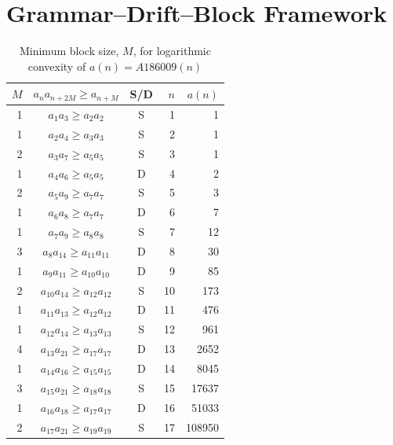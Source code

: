 \documentclass[12pt, oneside]{article}
\numberwithin{equation}{section}
\theoremstyle{definition}
\theoremstyle{plain}
\theoremstyle{remark}
\begin{document}
\section{Grammar–Drift–Block Framework}
\label{sec:grammar-drift-block}

\begin{table}[htbp]
\centering
\caption{Minimum block size, $M$, for logarithmic convexity of $a(n) = A186009(n)$}
\label{tab:A186009}
\vspace{4pt}
\begin{tabular}{@{}rccrr@{}}
\toprule
$M$ & $a_{n} a_{n+2M} \ge a_{n+M}$ & {S/D} & $n$ & $a(n)$ \\
\midrule
1 & $a_{ 1} a_{ 3} \ge a_{ 2} a_{ 2}$ & S &  1 &            1 \\
1 & $a_{ 2} a_{ 4} \ge a_{ 3} a_{ 3}$ & S &  2 &            1 \\
2 & $a_{ 3} a_{ 7} \ge a_{ 5} a_{ 5}$ & S &  3 &            1 \\
1 & $a_{ 4} a_{ 6} \ge a_{ 5} a_{ 5}$ & D &  4 &            2 \\
2 & $a_{ 5} a_{ 9} \ge a_{ 7} a_{ 7}$ & S &  5 &            3 \\
1 & $a_{ 6} a_{ 8} \ge a_{ 7} a_{ 7}$ & D &  6 &            7 \\
1 & $a_{ 7} a_{ 9} \ge a_{ 8} a_{ 8}$ & S &  7 &           12 \\
3 & $a_{ 8} a_{14} \ge a_{11} a_{11}$ & D &  8 &           30 \\
1 & $a_{ 9} a_{11} \ge a_{10} a_{10}$ & D &  9 &           85 \\
2 & $a_{10} a_{14} \ge a_{12} a_{12}$ & S & 10 &          173 \\
1 & $a_{11} a_{13} \ge a_{12} a_{12}$ & D & 11 &          476 \\
1 & $a_{12} a_{14} \ge a_{13} a_{13}$ & S & 12 &          961 \\
4 & $a_{13} a_{21} \ge a_{17} a_{17}$ & D & 13 &         2652 \\
1 & $a_{14} a_{16} \ge a_{15} a_{15}$ & D & 14 &         8045 \\
3 & $a_{15} a_{21} \ge a_{18} a_{18}$ & S & 15 &        17637 \\
1 & $a_{16} a_{18} \ge a_{17} a_{17}$ & D & 16 &        51033 \\
2 & $a_{17} a_{21} \ge a_{19} a_{19}$ & S & 17 &       108950 \\

\end{tabular}
\end{table}
\end{document}
